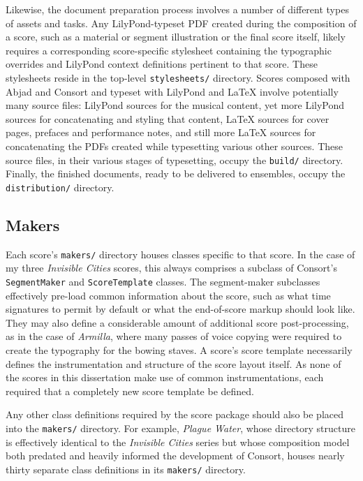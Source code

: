 Likewise, the document preparation process involves a number of different types
of assets and tasks. Any LilyPond-typeset PDF created during the composition of
a score, such as a material or segment illustration or the final score itself,
likely requires a corresponding score-specific stylesheet containing the
typographic overrides and LilyPond context definitions pertinent to that score.
These stylesheets reside in the top-level \texttt{stylesheets/} directory.
Scores composed with Abjad and Consort and typeset with LilyPond and LaTeX
involve potentially many source files: LilyPond sources for the musical
content, yet more LilyPond sources for concatenating and styling that content,
LaTeX sources for cover pages, prefaces and performance notes, and still more
LaTeX sources for concatenating the PDFs created while typesetting various
other sources. These source files, in their various stages of typesetting,
occupy the \texttt{build/} directory. Finally, the finished documents, ready to
be delivered to ensembles, occupy the \texttt{distribution/} directory.

\subsection{Makers}
\label{ssec:makers}

Each score's \texttt{makers/} directory houses classes specific to that score.
In the case of my three \emph{Invisible Cities} scores, this always comprises a
subclass of Consort's \texttt{SegmentMaker} and \texttt{ScoreTemplate} classes.
The segment-maker subclasses effectively pre-load common information about the
score, such as what time signatures to permit by default or what the
end-of-score markup should look like. They may also define a considerable
amount of additional score post-processing, as in the case of
\emph{Armilla}, where many passes of voice copying were required to create the
typography for the bowing staves. A score's score template necessarily defines
the instrumentation and structure of the score layout itself. As none of the
scores in this dissertation make use of common instrumentations, each required
that a completely new score template be defined.

Any other class definitions required by the score package should also be placed
into the \texttt{makers/} directory. For example, \emph{Plague Water}, whose
directory structure is effectively identical to the \emph{Invisible Cities}
series but whose composition model both predated and heavily informed the
development of Consort, houses nearly thirty separate class definitions in its
\texttt{makers/} directory.

